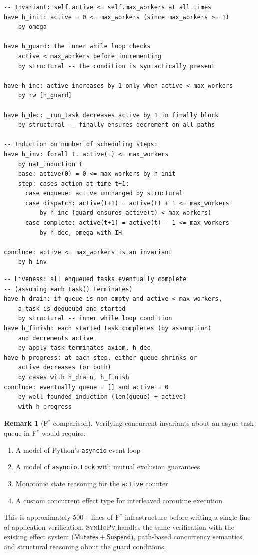 \documentclass[11pt,a4paper]{report}
\theoremstyle{definition}
\newtheorem{remark}[definition]{Remark}
\theoremstyle{plain}
\newcommand{\Mutates}{\mathsf{Mutates}}
\newcommand{\fstar}{F$^{*}$}
\newcommand{\synhopy}{\textsc{SynHoPy}}
\begin{document}
\begin{lstlisting}[style=proof]
-- Invariant: self.active <= self.max_workers at all times
have h_init: active = 0 <= max_workers (since max_workers >= 1)
    by omega

have h_guard: the inner while loop checks
    active < max_workers before incrementing
    by structural -- the condition is syntactically present

have h_inc: active increases by 1 only when active < max_workers
    by rw [h_guard]

have h_dec: _run_task decreases active by 1 in finally block
    by structural -- finally ensures decrement on all paths

-- Induction on number of scheduling steps:
have h_inv: forall t. active(t) <= max_workers
    by nat_induction t
    base: active(0) = 0 <= max_workers by h_init
    step: cases action at time t+1:
      case enqueue: active unchanged by structural
      case dispatch: active(t+1) = active(t) + 1 <= max_workers
          by h_inc (guard ensures active(t) < max_workers)
      case complete: active(t+1) = active(t) - 1 <= max_workers
          by h_dec, omega with IH

conclude: active <= max_workers is an invariant
    by h_inv
\end{lstlisting}

\begin{lstlisting}[style=proof]
-- Liveness: all enqueued tasks eventually complete
-- (assuming each task() terminates)
have h_drain: if queue is non-empty and active < max_workers,
    a task is dequeued and started
    by structural -- inner while loop condition
have h_finish: each started task completes (by assumption)
    and decrements active
    by apply task_terminates_axiom, h_dec
have h_progress: at each step, either queue shrinks or
    active decreases (or both)
    by cases with h_drain, h_finish
conclude: eventually queue = [] and active = 0
    by well_founded_induction (len(queue) + active)
    with h_progress
\end{lstlisting}

\begin{remark}[\fstar{} comparison]
Verifying concurrent invariants about an async task queue in \fstar{} would
require:
\begin{enumerate}
  \item A model of Python's \texttt{asyncio} event loop
  \item A model of \texttt{asyncio.Lock} with mutual exclusion guarantees
  \item Monotonic state reasoning for the \texttt{active} counter
  \item A custom concurrent effect type for interleaved coroutine execution
\end{enumerate}
This is approximately 500+ lines of \fstar{} infrastructure before writing a
single line of application verification.  \synhopy{} handles the same
verification with the existing effect system ($\Mutates + \mathsf{Suspend}$),
path-based concurrency semantics, and structural reasoning about the
guard conditions.
\end{remark}
\end{document}
